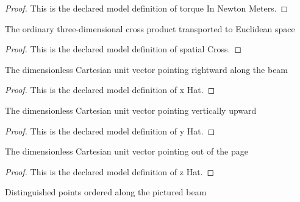 \begin{proof}
  This is the declared model definition of torque In Newton Meters.
\end{proof}
\begin{definition}
  \label{def:physics:phyx-mini-0702:phyxminiproblems-problemphyxmini0702-spatialcross}
  The ordinary three-dimensional cross product transported to Euclidean space
\end{definition}
\begin{proof}
  This is the declared model definition of spatial Cross.
\end{proof}
\begin{definition}[x Hat]
  \label{def:physics:phyx-mini-0702:phyxminiproblems-problemphyxmini0702-xhat}
  The dimensionless Cartesian unit vector pointing rightward along the beam
\end{definition}
\begin{proof}
  This is the declared model definition of x Hat.
\end{proof}
\begin{definition}[y Hat]
  \label{def:physics:phyx-mini-0702:phyxminiproblems-problemphyxmini0702-yhat}
  The dimensionless Cartesian unit vector pointing vertically upward
\end{definition}
\begin{proof}
  This is the declared model definition of y Hat.
\end{proof}
\begin{definition}[z Hat]
  \label{def:physics:phyx-mini-0702:phyxminiproblems-problemphyxmini0702-zhat}
  The dimensionless Cartesian unit vector pointing out of the page
\end{definition}
\begin{proof}
  This is the declared model definition of z Hat.
\end{proof}
\begin{definition}
  \label{def:physics:phyx-mini-0702:phyxminiproblems-problemphyxmini0702-beampoint}
  Distinguished points ordered along the pictured beam
\end{definition}
